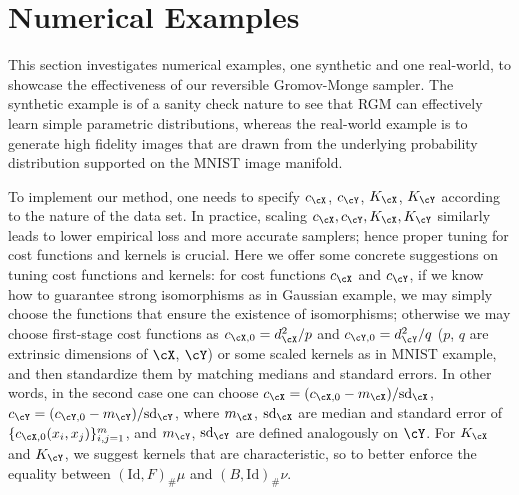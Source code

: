 \documentclass[11pt]{article}
\def\wg#1{{\color{Orange} \marginnote{\textbf{WG}}#1}}
\begin{document}
\section{Numerical Examples}
\label{sec:numerical}


This section investigates numerical examples, one synthetic and one real-world,  to showcase the effectiveness of our reversible Gromov-Monge sampler. The synthetic example is of a sanity check nature to see that RGM can effectively learn simple parametric distributions, whereas the real-world example is to generate high fidelity images that are drawn from the underlying probability distribution supported on the MNIST image manifold.

To implement our method, one needs to specify $c_\cX$, $c_\cY$, $K_\cX$, $K_\cY$ according to the nature of the data set.
In practice, scaling $c_\cX, c_\cY, K_\cX, K_\cY$ similarly leads to lower empirical loss and more accurate samplers; hence proper tuning for cost functions and kernels is crucial.
%
Here we offer some concrete suggestions on tuning cost functions and kernels: for cost functions $c_\cX$ and $c_\cY$,
if we know how to guarantee strong isomorphisms as in Gaussian example, we may simply choose the functions that ensure the existence of isomorphisms; otherwise we may choose first-stage cost functions as $c_{\cX, 0} = d_\cX^2/p$ and $c_{\cY, 0} = d_\cY^2/q$ ($p$, $q$ are extrinsic dimensions of $\cX$, $\cY$) or some scaled kernels as in MNIST example, and then standardize them by matching medians and standard errors. In other words, in the second case one can choose $c_\cX = (c_{\cX, 0}-m_\cX)/\text{sd}_{\cX}$, 
$c_\cY = (c_{\cY, 0}-m_\cY)/\text{sd}_{\cY}$, where $m_\cX$, $\text{sd}_\cX$ are median and standard error of $\{c_{\cX, 0}(x_i, x_j)\}_{i, j = 1}^{m}$, and $m_\cY$, $\text{sd}_\cY$ are defined analogously on $\cY$.
For $K_\cX$ and $K_\cY$, we suggest
kernels that are characteristic, so to better enforce the equality between $(\mathrm{Id}, F)_{\#}\mu$ and $(B, \mathrm{Id})_{\#} \nu$.
\end{document}
